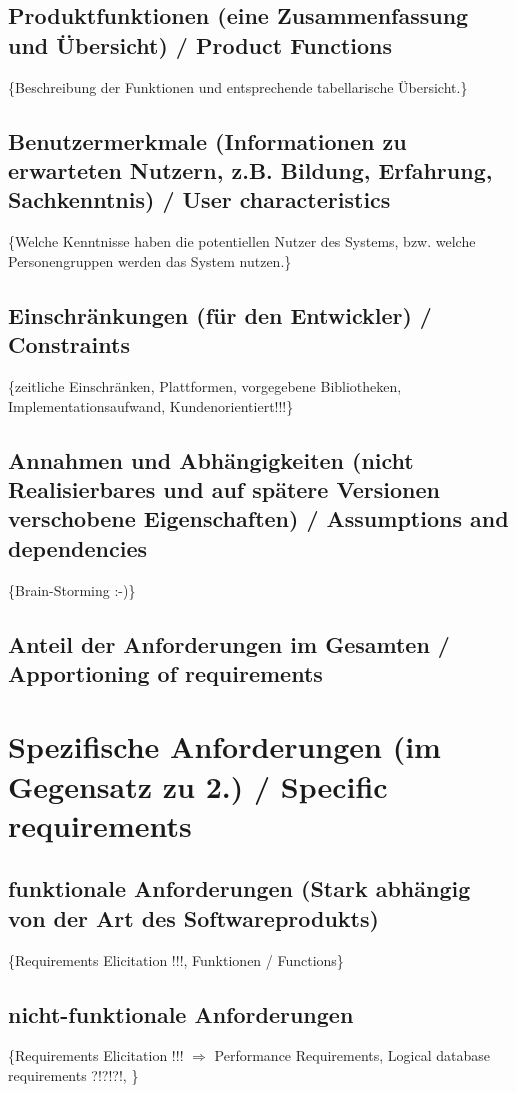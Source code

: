 \documentclass[11pt,a4paper]{article}
\begin{document}
  	\subsection{Produktfunktionen (eine Zusammenfassung und Übersicht) / Product Functions}  %
	\{Beschreibung der Funktionen und entsprechende tabellarische Übersicht.\}     
    \subsection{Benutzermerkmale (Informationen zu erwarteten Nutzern, z.B. Bildung, Erfahrung, Sachkenntnis) / User characteristics} %
	\{Welche Kenntnisse haben die potentiellen Nutzer des Systems, bzw. welche Personengruppen werden das System nutzen.\}    
	\subsection{Einschränkungen (für den Entwickler) / Constraints} %
	\{zeitliche Einschränken, Plattformen, vorgegebene Bibliotheken, Implementationsaufwand, Kundenorientiert!!!\}
	\subsection{Annahmen und Abhängigkeiten (nicht Realisierbares und auf spätere Versionen verschobene Eigenschaften) / Assumptions and dependencies} %
	\{Brain-Storming :-)\}
	\subsection{Anteil der Anforderungen im Gesamten / Apportioning of requirements} %

\newpage
\section{Spezifische Anforderungen (im Gegensatz zu 2.) / Specific requirements} %
	\subsection{funktionale Anforderungen (Stark abhängig von der Art des Softwareprodukts)} %
	\{Requirements Elicitation !!!, Funktionen / Functions\}
	\subsection{nicht-funktionale Anforderungen} %
	\{Requirements Elicitation !!! $\Longrightarrow$ Performance Requirements, Logical database requirements ?!?!?!, \}
\end{document}
